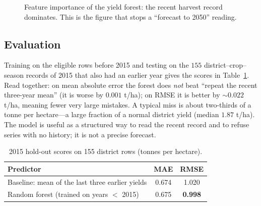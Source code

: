 \documentclass[11pt,a4paper]{article}
\begin{document}
\begin{figure}[h]
\centering
{}
\caption{Feature importance of the yield forest: the recent harvest record dominates. This is the
figure that stops a ``forecast to 2050'' reading.}
\label{fig:imp}
\end{figure}

\subsection{Evaluation}
Training on the eligible rows before 2015 and testing on the $155$ district--crop--season records of
2015 that also had an earlier year gives the scores in Table~\ref{tab:yield}. Read together: on mean
absolute error the forest does \emph{not} beat ``repeat the recent three-year mean'' (it is worse by
$0.001$ t/ha); on RMSE it is better by $\sim0.022$ t/ha, meaning fewer very large mistakes. A typical
miss is about two-thirds of a tonne per hectare---a large fraction of a normal district yield (median
$1.87$ t/ha). The model is useful as a structured way to read the recent record and to refuse series
with no history; it is not a precise forecast.

\begin{table}[h]
\centering\small
\caption{2015 hold-out scores on 155 district rows (tonnes per hectare).}
\label{tab:yield}
\begin{tabular}{lcc}
\toprule
\textbf{Predictor} & \textbf{MAE} & \textbf{RMSE}\\
\midrule
Baseline: mean of the last three earlier yields & 0.674 & 1.020\\
Random forest (trained on years $<$ 2015) & 0.675 & \textbf{0.998}\\
\bottomrule
\end{tabular}
\end{table}
\end{document}
